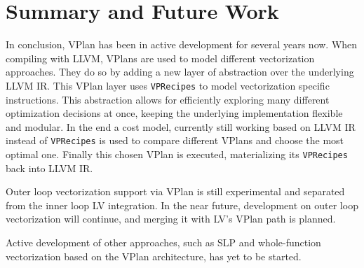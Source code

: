 \documentclass[sigplan,11pt,nonacm]{acmart}
\begin{document}
\section{Summary and Future Work}
\label{sec:summary}
In conclusion, VPlan has been in active development for several years now. When compiling with LLVM, 
VPlans are used to model different vectorization approaches. They do so by adding a new layer of 
abstraction over the underlying LLVM IR. This VPlan layer uses \texttt{VPRecipes} to model vectorization 
specific instructions. This abstraction allows for efficiently exploring many different optimization 
decisions at once, keeping the underlying implementation flexible and modular. In the end a cost model, 
currently still working based on LLVM IR instead of \texttt{VPRecipes} is used to compare different VPlans 
and choose the most optimal one. Finally this chosen VPlan is executed, materializing its \texttt{VPRecipes} 
back into LLVM IR.

Outer loop vectorization support via VPlan is still experimental and separated from the inner loop
LV integration. In the near future, development on outer loop vectorization will continue, and merging 
it with LV's VPlan path is planned.

Active development of other approaches, such as SLP and whole-function vectorization based on the VPlan 
architecture, has yet to be started.



\end{document}
